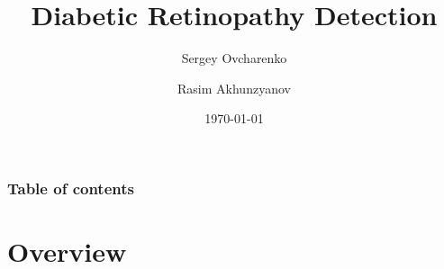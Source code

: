 \documentclass{beamer}
\begin{document}
\title{Diabetic Retinopathy Detection}
\subtitle{}  
\author[]{Sergey Ovcharenko  \and Rasim Akhunzyanov }

\date{\today} 

\begin{frame}
\titlepage
\end{frame}

\begin{frame}
\frametitle{Table of contents}\tableofcontents
\end{frame} 



\section{Overview} 
\end{document}
